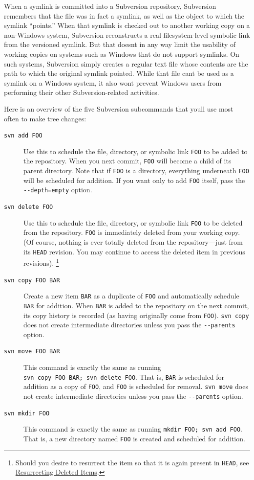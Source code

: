 When a symlink is committed into a Subversion repository, Subversion
remembers that the file was in fact a symlink, as well as the object to
which the symlink ``points.'' When that symlink is checked out to
another working copy on a non-Windows system, Subversion reconstructs a
real filesystem-level symbolic link from the versioned symlink. But that
doesn\textquotesingle t in any way limit the usability of working copies
on systems such as Windows that do not support symlinks. On such
systems, Subversion simply creates a regular text file whose contents
are the path to which the original symlink pointed. While that file
can\textquotesingle t be used as a symlink on a Windows system, it also
won\textquotesingle t prevent Windows users from performing their other
Subversion-related activities.

Here is an overview of the five Subversion subcommands that
you\textquotesingle ll use most often to make tree changes:

\begin{description}
\item[\texttt{svn\ add\ FOO}]
Use this to schedule the file, directory, or symbolic link \texttt{FOO}
to be added to the repository. When you next commit, \texttt{FOO} will
become a child of its parent directory. Note that if \texttt{FOO} is a
directory, everything underneath \texttt{FOO} will be scheduled for
addition. If you want only to add \texttt{FOO} itself, pass the
\texttt{-\/-depth=empty} option.
\item[\texttt{svn\ delete\ FOO}]
Use this to schedule the file, directory, or symbolic link \texttt{FOO}
to be deleted from the repository. \texttt{FOO} is immediately deleted
from your working copy. (Of course, nothing is ever totally deleted from
the repository---just from its \texttt{HEAD} revision. You may continue
to access the deleted item in previous revisions). \footnote{Should you
  desire to resurrect the item so that it is again present in
  \texttt{HEAD}, see
  \hyperref[svn.branchmerge.basicmerging.resurrect]{Resurrecting Deleted
  Items}.}
\item[\texttt{svn\ copy\ FOO\ BAR}]
Create a new item \texttt{BAR} as a duplicate of \texttt{FOO} and
automatically schedule \texttt{BAR} for addition. When \texttt{BAR} is
added to the repository on the next commit, its copy history is recorded
(as having originally come from \texttt{FOO}). \texttt{svn\ copy} does
not create intermediate directories unless you pass the
\texttt{-\/-parents} option.
\item[\texttt{svn\ move\ FOO\ BAR}]
This command is exactly the same as running
\texttt{svn\ copy\ FOO\ BAR;\ svn\ delete\ FOO}. That is, \texttt{BAR}
is scheduled for addition as a copy of \texttt{FOO}, and \texttt{FOO} is
scheduled for removal. \texttt{svn\ move} does not create intermediate
directories unless you pass the \texttt{-\/-parents} option.
\item[\texttt{svn\ mkdir\ FOO}]
This command is exactly the same as running
\texttt{mkdir\ FOO;\ svn\ add\ FOO}. That is, a new directory named
\texttt{FOO} is created and scheduled for addition.
\end{description}

